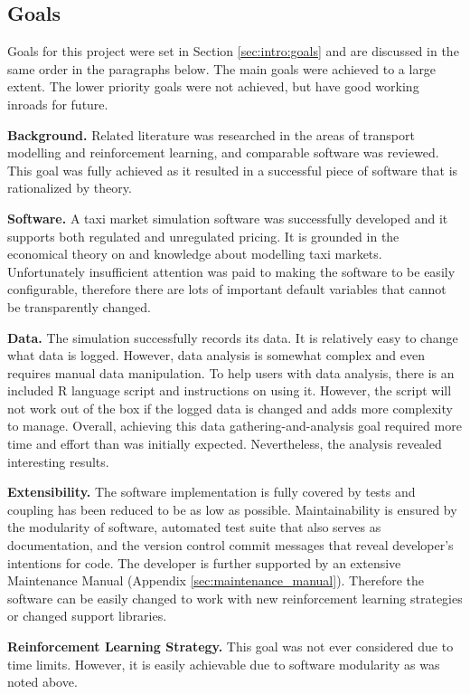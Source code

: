 \subsection{Goals}

Goals for this project were set in Section \ref{sec:intro:goals} and are
discussed in the same order in the paragraphs below. The main goals were
achieved to a large extent. The lower priority goals were not achieved, but
have good working inroads for future.

\textbf{Background.} Related literature was researched in the areas of
transport modelling and reinforcement learning, and comparable software was
reviewed. This goal was fully achieved as it resulted in a successful piece of
software that is rationalized by theory.

\textbf{Software.} A taxi market simulation software was successfully developed
and it supports both regulated and unregulated pricing. It is grounded in the
economical theory on  and knowledge about modelling taxi markets. Unfortunately
insufficient attention was paid to making the software to be easily
configurable, therefore there are lots of important default variables that
cannot be transparently changed.

\textbf{Data.} The simulation successfully records its data. It is
relatively easy to change what data is logged. However, data analysis is
somewhat complex and even requires manual data manipulation. To help users with
data analysis, there is an included R language script and instructions on using
it. However, the script will not work out of the box if the logged data is
changed and adds more complexity to manage. Overall, achieving this data
gathering-and-analysis goal required more time and effort than was initially
expected. Nevertheless, the analysis revealed interesting results.

\textbf{Extensibility.} The software implementation is fully covered by tests
and coupling has been reduced to be as low as possible. Maintainability is
ensured by the modularity of software, automated test suite that also serves as
documentation, and the version control commit messages that reveal developer's
intentions for code. The developer is further supported by an extensive
Maintenance Manual (Appendix \ref{sec:maintenance_manual}). Therefore the
software can be easily changed to work with new reinforcement learning
strategies or changed support libraries.

\textbf{Reinforcement Learning Strategy.} This goal was not ever considered due
to time limits. However, it is easily achievable due to software modularity as
was noted above.

